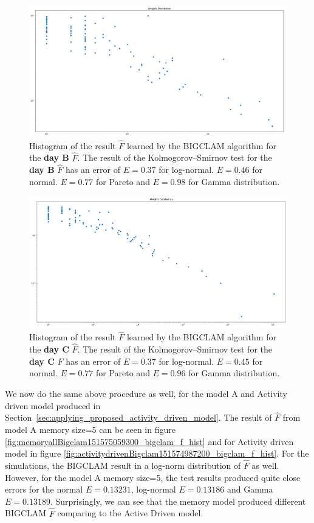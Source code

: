 \documentclass[../../thesis.tex]{subfiles}
\begin{document}
\begin{figure}[H]
\centering
\includegraphics[width=\textwidth]{content/learning/img/daymodel165_bigclam_f_hist}
\caption{Histogram of the result $\hat{F}$ learned by the BIGCLAM algorithm for the \textbf{day B} $\hat{F}$. The result of the Kolmogorov–Smirnov test for the \textbf{day B} $\hat{F}$ has an error of $E=0.37$ for log-normal. $E=0.46$ for normal. $E=0.77$ for Pareto and $E=0.98$ for Gamma distribution. }
\label{fig:daymodel165_bigclam_f_hist}
\end{figure}

\begin{figure}[H]
\centering
\includegraphics[width=\textwidth]{content/learning/img/daymodel210_bigclam_f_hist}
\caption{Histogram of the result $\hat{F}$ learned by the BIGCLAM algorithm for the \textbf{day C} $\hat{F}$. The result of the Kolmogorov–Smirnov test for the \textbf{day C} $\hat{F}$ has an error of $E=0.37$ for log-normal. $E=0.45$ for normal. $E=0.77$ for Pareto and $E=0.96$ for Gamma distribution. }
\label{fig:daymodel210_bigclam_f_hist}
\end{figure}


We now do the same above procedure as well, for the model A and Activity driven model produced in Section~\ref{sec:applying_proposed_activity_driven_model}. The result of $\hat{F}$ from model A memory size=5 can be seen in figure \ref{fig:memoryallBigclam151575059300_bigclam_f_hist} and for Activity driven model in figure \ref{fig:activitydrivenBigclam151574987200_bigclam_f_hist}. For the simulations, the BIGCLAM result in a log-norm distribution of $\hat{F}$ as well. However, for the model A memory size=5, the test results produced quite close errors for the normal $E=0.13231$, log-normal $E=0.13186$ and Gamma $E=0.13189$. Surprisingly, we can see that the memory model produced different BIGCLAM $\hat{F}$ comparing to the Active Driven model. 
\end{document}

